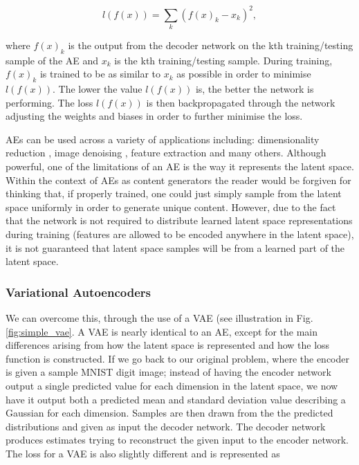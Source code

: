 \begin{equation}
    l(f(x)) = \sum_k{(f(x)_k - x_k)^2},
\end{equation}

where $f(x)_k$ is the output from the decoder network on the 
kth training/testing sample of the \ac{AE} and $x_k$ is the 
kth training/testing sample. During training, $f(x)_k$ is trained 
to be as similar to $x_k$ as possible in order to minimise 
$l(f(x))$. The lower the value $l(f(x))$ is, the better the network 
is performing. The loss $l(f(x))$ is then backpropagated through 
the network adjusting the weights and biases in order to  
further minimise the loss.

\ac{AE}s can be used across a variety of applications including: 
dimensionality reduction \cite{6910027}, image denoising \cite{NISHIO2017e00393},
feature extraction \cite{7965877} and many others. Although powerful, 
one of the limitations of an \ac{AE} is the way it represents the 
latent space. Within the context of \ac{AE}s as content generators 
the reader would be forgiven for thinking that, if properly trained, 
one could just simply sample from the latent space uniformly 
in order to generate unique content. However, due to the fact 
that the network is not required to distribute learned latent 
space representations during training (features are allowed 
to be encoded anywhere in the latent space), it is not 
guaranteed that latent space samples will be from a 
learned part of the latent space.

%
%
\subsubsection{Variational Autoencoders}

We can overcome this, through the use of a \ac{VAE} (see illustration in 
Fig.\ref{fig:simple_vae}. 
A \ac{VAE} is nearly identical to an \ac{AE}, except for 
the main differences arising from how the latent space 
is represented and how the loss function is constructed. 
If we go back to our original problem, where the encoder is given 
a sample MNIST digit image; instead of having the encoder network 
output a single predicted value for each dimension in the 
latent space, we now have it output both a predicted 
mean and standard deviation value describing a Gaussian 
for each dimension. Samples are then drawn from the the 
predicted distributions and given as input the decoder network. 
The decoder network produces estimates trying to reconstruct 
the given input to the encoder network. The loss for 
a \ac{VAE} is also slightly different and is represented 
as 

